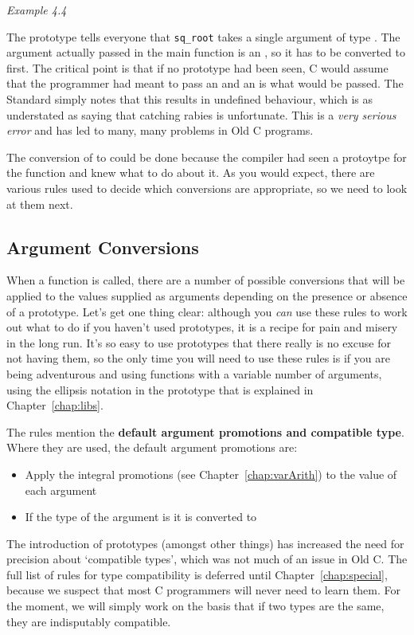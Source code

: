 \begin{center}\textit{Example 4.4}\end{center}


   The prototype tells everyone that \texttt{sq\_root} takes a single
    argument of type \double. The argument actually passed in
    the main function is an \kint, so it has to be converted to
    \double{} first. The critical point is that if no prototype
    had been seen, C would assume that the programmer had meant to pass an
    \kint{} and an \kint{} is what would be passed. The
    Standard simply notes that this results in undefined behaviour, which is
    as understated as saying that catching rabies is unfortunate. This is a
    \textit{very serious error} and has led to many, many problems in Old C
    programs.


   The conversion of \kint{} to \double{} could be
    done because the compiler had seen a protoytpe for the function and knew
    what to do about it. As you would expect, there are various rules used
    to decide which conversions are appropriate, so we need to look at them
    next.



  \subsection{Argument Conversions}
   

   When a function is called, there are a number of possible conversions
    that will be applied to the values supplied as arguments depending on
    the presence or absence of a prototype. Let's get one thing clear:
    although you \textit{can} use these rules to work out what to do if you
    haven't used prototypes, it is a recipe for pain and misery in the long
    run. It's so easy to use prototypes that there really is no excuse for
    not having them, so the only time you will need to use these rules is if
    you are being adventurous and using functions with a variable number of
    arguments, using the ellipsis notation in the prototype that is
    explained in Chapter~\ref{chap:libs}.


   The rules mention the \textbf{default argument promotions and compatible
     type}. Where they are used, the default argument promotions
    are:

   \begin{itemize}
    \item Apply the integral promotions (see Chapter~\ref{chap:varArith}) to the
     value of each argument
    \item If the type of the argument is \float{} it is converted to
     \double{}
   \end{itemize}
   The introduction of prototypes (amongst other things) has increased
    the need for precision about `compatible types', which was not
    much of an issue in Old C. The full list of rules for type compatibility
    is deferred until Chapter~\ref{chap:special}, because we suspect that most C
    programmers will never need to learn them. For the moment, we will
    simply work on the basis that if two types are the same, they are
    indisputably compatible.



